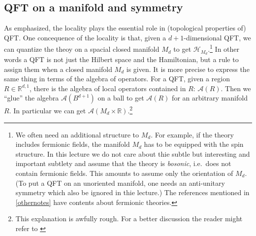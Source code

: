 \documentclass[
]{scrartcl}
\numberwithin{equation}{section}
\theoremstyle{definition}
\theoremstyle{definition}
\theoremstyle{definition}
\theoremstyle{definition}
\theoremstyle{remark}
\begin{document}
\hypertarget{qft-on-a-manifold-and-symmetry}{%
\subsection{QFT on a manifold and symmetry}\label{qft-on-a-manifold-and-symmetry}}

As emphasized, the locality plays the essential role in (topological properties of) QFT.
One concequence of the locality is that,
given a \(d+1\)-dimensional QFT, we can quantize the theoy on a spacial closed manifold \(M_d\) to get \(\mathcal{H}_{M_d}\).\footnote{We often need an additional structure to \(M_d\). For example, if the theory includes fermionic fields, the manifold \(M_d\) has to be equipped with the spin structure. In this lecture we do not care about thie subtle but interesting and important subtlety and assume that the theory is \emph{bosonic}, i.e.~does not contain fermionic fields. This amounts to assume only the orientation of \(M_d\). (To put a QFT on an unoriented manifold, one needs an anti-unitary symmetry which also be ignored in thie lecture.) The references mentioned in \ref{othernotes} have contents about fermionic theories.}
In other words a QFT is not just the Hilbert space and the Hamiltonian, but a rule to assign them when a closed manifold \(M_d\) is given.
It is more precise to express the same thing in terms of the algebra of operators.
For a QFT, given a region \(R \in \mathbb{R}^{d,1}\), there is the algebra of local operators contained in \(R\): \(\mathcal{A}(R)\).
Then we ``glue'' the algebra \(\mathcal{A}(B^{d+1})\) on a ball to get \(\mathcal{A}(R)\) for an arbitrary manifold \(R\). In particular we can get \(\mathcal{A}(M_d\times \mathbb{R})\).\footnote{This explanation is awfully rough. For a better discussion the reader might refer to \textcite{Witten:2021jzq}}
\end{document}
